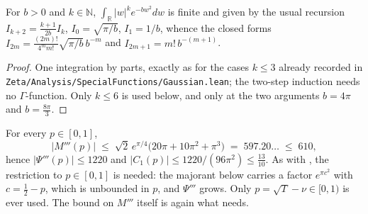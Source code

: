 \begin{lemma}
\label{lem:rsf_gauss_moments}
\leanok
For $b>0$ and $k\in\mathbb{N}$, $\int_{\mathbb{R}}\lvert w\rvert^{k}e^{-bw^{2}}dw$ is finite and
given by the usual recursion $I_{k+2}=\tfrac{k+1}{2b}I_{k}$, $I_{0}=\sqrt{\pi/b}$, $I_{1}=1/b$,
whence the closed forms
$I_{2m}=\tfrac{(2m)!}{4^{m}m!}\sqrt{\pi/b}\,b^{-m}$ and $I_{2m+1}=m!\,b^{-(m+1)}$.
\end{lemma}

\begin{proof}
\leanok
One integration by parts, exactly as for the cases $k\le3$ already recorded in
\texttt{Zeta/Analysis/SpecialFunctions/Gaussian.lean}; the two-step induction needs no
$\Gamma$-function.  Only $k\le6$ is used below, and only at the two arguments $b=4\pi$ and
$b=\tfrac{8\pi}3$.
\end{proof}

\begin{lemma}
\label{lem:rsf_psi3}
\leanok
{}
For every $p\in[0,1]$,
\[
  \lvert M'''(p)\rvert\;\le\;\sqrt2\,e^{\pi/4}\bigl(20\pi+10\pi^{2}+\pi^{3}\bigr)
    \;=\;597.20\ldots\;\le\;610 ,
\]
hence $\lvert\Psi'''(p)\rvert\le1220$ and $\lvert
C_{1}(p)\rvert\le1220/(96\pi^{2})\le\tfrac{13}{10}$.  As with
, the restriction to $p\in[0,1]$ is needed:
the majorant below carries a factor $e^{\pi c^{2}}$ with $c=\tfrac12-p$, which is unbounded in
$p$, and $\Psi'''$ grows.  Only $p=\sqrt T-\nu\in[0,1)$ is ever used.  The bound on
$M'''$ itself is again what  needs.
\end{lemma}

